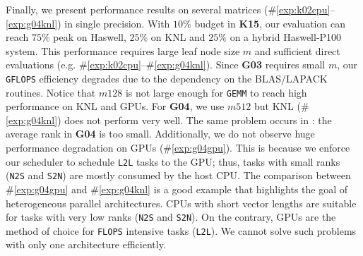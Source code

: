 Finally, we present performance results on several matrices 
(\#\ref{exp:k02cpu}--\ref{exp:g04knl}) in single precision.
With $10\%$ budget in \textbf{K15},
our evaluation can reach $75\%$ peak on Haswell, $25\%$ on KNL and $25\%$ 
on a hybrid Haswell-P100 system.
This performance requires large leaf node size $m$ and sufficient
direct evaluations (e.g. \#\ref{exp:k02cpu}--\#\ref{exp:g04knl}).
Since \textbf{G03} requires small $m$, our \texttt{GFLOPS} efficiency
degrades due to the dependency on the BLAS/LAPACK routines. 
Notice that $m128$ is not large enough for \texttt{GEMM}
to reach high performance on KNL and GPUs.
For \textbf{G04}, we use $m512$ but KNL (\#\ref{exp:g04knl}) does 
not perform very well. 
The same problem occurs in : 
the average rank in \textbf{G04} is too small. 
Additionally, we do not observe huge performance degradation on GPUs
(\#\ref{exp:g04gpu}). 
This is because we enforce our scheduler to schedule \texttt{L2L} tasks
to the GPU; thus, tasks with small ranks (\texttt{N2S} and
\texttt{S2N}) are mostly consumed by the host CPU.
The comparison between \#\ref{exp:g04gpu} and \#\ref{exp:g04knl} 
is a good example that highlights the goal of heterogeneous parallel
architectures. CPUs with short vector lengths are suitable for 
tasks with very low ranks  (\texttt{N2S} and \texttt{S2N}). 
On the contrary, GPUs are the method of choice for \texttt{FLOPS} intensive tasks (\texttt{L2L}).
We cannot solve such problems with only one architecture  efficiently.


